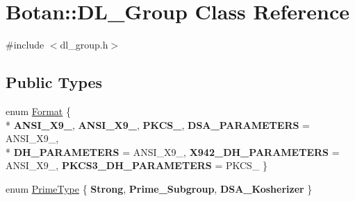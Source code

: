 \hypertarget{classBotan_1_1DL__Group}{\section{Botan\-:\-:D\-L\-\_\-\-Group Class Reference}
\label{classBotan_1_1DL__Group}
}


{\ttfamily \#include $<$dl\-\_\-group.\-h$>$}

\subsection*{Public Types}
\begin{DoxyCompactItemize}
\item 
enum \hyperlink{classBotan_1_1DL__Group_ac602a30420ceec03fa181a10b09312a7}{Format} \{ \\*
{\bfseries A\-N\-S\-I\-\_\-\-X9\-\_}, 
{\bfseries A\-N\-S\-I\-\_\-\-X9\-\_}, 
{\bfseries P\-K\-C\-S\-\_}, 
{\bfseries D\-S\-A\-\_\-\-P\-A\-R\-A\-M\-E\-T\-E\-R\-S} = A\-N\-S\-I\-\_\-\-X9\-\_, 
\\*
{\bfseries D\-H\-\_\-\-P\-A\-R\-A\-M\-E\-T\-E\-R\-S} = A\-N\-S\-I\-\_\-\-X9\-\_, 
{\bfseries X942\-\_\-\-D\-H\-\_\-\-P\-A\-R\-A\-M\-E\-T\-E\-R\-S} = A\-N\-S\-I\-\_\-\-X9\-\_, 
{\bfseries P\-K\-C\-S3\-\_\-\-D\-H\-\_\-\-P\-A\-R\-A\-M\-E\-T\-E\-R\-S} = P\-K\-C\-S\-\_
 \}
\item 
enum \hyperlink{classBotan_1_1DL__Group_ab5b6922453bcee11d6a4b3ebcf36f54b}{Prime\-Type} \{ {\bfseries Strong}, 
{\bfseries Prime\-\_\-\-Subgroup}, 
{\bfseries D\-S\-A\-\_\-\-Kosherizer}
 \}
\end{DoxyCompactItemize}
